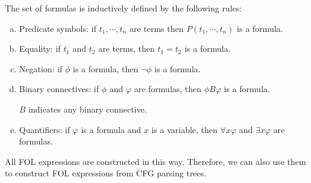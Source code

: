\documentclass{article}
\begin{document}
{{		The set of formulas is inductively defined by the following rules:

		\begin{enumerate}[(a)]
		\item {
			Predicate symbols: if $t_1, \cdots, t_n$ are terms then $P(t_1, \cdots, t_n)$ is a formula. 
		}

		\item {
			Equality: if $t_1$ and $t_2$ are terms, then $t_1 = t_2$ is a formula. 
		}

		\item {
			Negation: if $\phi $ is a formula, then $\neg \phi $ is a formula. 
		}

		\item {
			Binary connectives: if $\phi $ and $\varphi $ are formulas, then $\phi B \varphi $ is a formula. 

			$B$ indicates any binary connective. 
		}

		\item {
			Quantifiers: if $\varphi$ is a formula and $x$ is a variable, then $\forall x \varphi$ and $\exists x \varphi $ are formulas.  
		}
		\end{enumerate}

		All FOL expressions are constructed in this way. Therefore, we can also use them to construct FOL expressions from CFG parsing trees. 
	}
}
\end{document}
